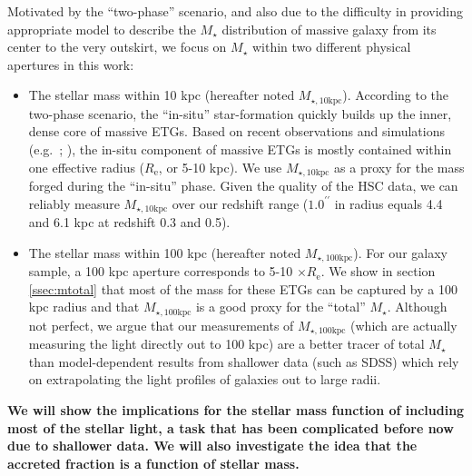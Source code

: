 \documentclass[a4paper,fleqn,usenatbib]{mnras}
\def\arcsec{{\prime\prime}}
\def\mstar{{$M_{\star}$}}
\def\minn{{$M_{\star,10\mathrm{kpc}}$}}
\def\mtot{{$M_{\star,100\mathrm{kpc}}$}}
\begin{document}
    Motivated by the ``two-phase'' scenario, and also due to the difficulty in 
    providing appropriate model to describe the \mstar{} distribution of massive 
    galaxy from its center to the very outskirt, we focus on \mstar{} within two 
    different physical apertures in this work:
    
    \begin{itemize}
    
        \item The stellar mass within 10 kpc (hereafter noted \minn{}). 
            According to the two-phase scenario, the ``in-situ'' star-formation quickly 
            builds up the inner, dense core of massive ETGs.  
            Based on recent observations and simulations (e.g.~\citealt{vanDokkum2010}; 
            \citealt{RodriguezGomez2016}), the in-situ component of massive ETGs is 
            mostly contained within one effective radius ($R_{\mathrm{e}}$, or 5-10 kpc). 
            We use \minn{} as a proxy for the mass forged during the ``in-situ''
            phase. 
            Given the quality of the HSC data, we can reliably measure \minn{} over our 
            redshift range ($1.0^{\arcsec}$ in radius equals 4.4 and 6.1 kpc at redshift
            0.3 and 0.5).  
            
        \item The stellar mass within 100 kpc (hereafter noted \mtot{}). 
            For our galaxy sample, a 100 kpc aperture corresponds to 5-10 
            $\times R_{\mathrm{e}}$. 
            We show in section \ref{ssec:mtotal} that most of the mass for these ETGs 
            can be captured by a 100 kpc radius and that \mtot{} is a good proxy for the 
            ``total'' \mstar{}. 
            Although not perfect, we argue that our measurements of \mtot{} (which are 
            actually measuring the light directly out to 100 kpc) are a better tracer 
            of total \mstar{} than model-dependent results from shallower data 
            (such as SDSS) which rely on extrapolating the light profiles of galaxies 
            out to large radii.
            
   \end{itemize}

    {\bf We will show the implications for the stellar mass function of including most of 
    the stellar light, a task that has been complicated before now due to shallower data. 
    We will also investigate the idea that the accreted fraction is a function of stellar mass.}
    
\end{document}
